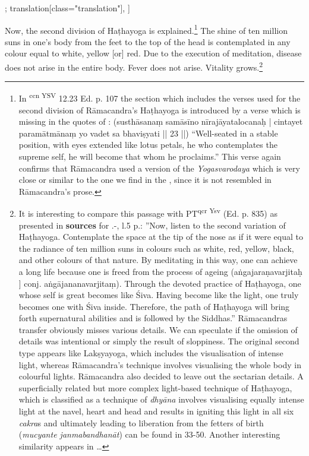 \begin{alignment}[
  texts=edition[class="edition"];
  translation[class="translation"],
  ]
\begin{translation}
\begin{tlate}
        \indent Now, the second division of Haṭhayoga is explained.\footnote{In \textsuperscript{ccn \cdot YSV} 12.23 Ed. p. 107 the section which includes the verses used for the second division of Rāmacandra's Haṭhayoga is introduced by a verse which is missing in the quotes of : (susthāsanaṃ samāsīno nīrajāyatalocanaḥ | cintayet paramātmānaṃ yo vadet sa bhaviṣyati || 23 ||) ``Well-seated in a stable position, with eyes extended like lotus petals, he who contemplates the supreme self, he will become that whom he proclaims.'' This verse again confirms that Rāmacandra used a version of the \textit{Yogasvarodaya} which is very close or similar to the one we find in the , since it is not resembled in Rāmacandra's prose.} The shine of ten million suns in one's body from the feet to the top of the head is contemplated in any colour equal to white, yellow [or] red. Due to the execution of meditation, disease does not arise in the entire body.\textsuperscript{\coro{[\lowroman{10}]}}  Fever does not arise. Vitality grows.\footnote{It is interesting to compare this passage with PT\textsuperscript{qcr \cdot Ysv} (Ed. p. 835) as presented in \textbf{sources} for .-, l.5 p.\pageref{hathayoga}: ''Now, listen to the second variation of Haṭhayoga. Contemplate the space at the tip of the nose as if it were equal to the radiance of ten million suns in colours such as white, red, yellow, black, and other colours of that nature. By meditating in this way, one can achieve a long life because one is freed from the process of ageing (aṅgajaraṇavarjitaḥ ] conj. aṅgājananavarjitaṃ). Through the devoted practice of Haṭhayoga, one whose self is great becomes like Śiva. Having become like the light, one truly becomes one with Śiva inside. Therefore, the path of Haṭhayoga will bring forth supernatural abilities and is followed by the Siddhas.'' Rāmacandras transfer obviously misses various details. We can speculate if the omission of details was intentional or simply the result of sloppiness. The original second type appears like Lakṣyayoga, which includes the visualisation of intense light, whereas Rāmacandra's technique involves visualising the whole body in colourful lights. Rāmacandra also decided to leave out the sectarian details. A superficially related but more complex light-based technique of Haṭhayoga, which is classified as a technique of \textit{dhyāna} involves visualising equally intense light at the navel, heart and head and results in igniting this light in all six \textit{cakra}s and ultimately leading to liberation from the fetters of birth (\textit{mucyante janmabandhanāt}) can be found in  33-50. Another interesting similarity appears in \ldots}
        \end{tlate}
      \end{translation}
    \end{alignment}
